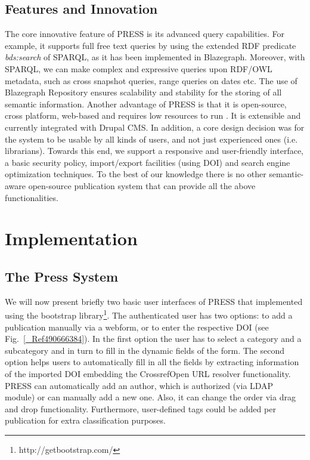 \documentclass[runningheads,a4paper]{llncs}
\begin{document}
\subsection{Features and Innovation}

The core innovative feature of PRESS is its advanced query capabilities. For example, it supports full free text queries by using the extended RDF predicate {\em bds:search} of SPARQL, as it has been implemented in Blazegraph. Moreover, with SPARQL, we can make complex and expressive queries upon RDF/OWL metadata, such as cross snapshot queries, range queries on dates etc.  The use of Blazegraph Repository ensures scalability and stability  \cite{_Ref490664453} for the storing of all semantic information. Another advantage of PRESS is that it is open-source, cross platform, web-based and requires low resources to run  \cite{_Ref490664467}. It is extensible and currently integrated with Drupal CMS. In addition, a core design decision was for the system to be usable by all kinds of users, and not just experienced ones (i.e. librarians). Towards this end, we support a responsive and user-friendly interface, a basic security policy, import/export facilities (using DOI) and search engine optimization techniques. To the best of our knowledge there is no other semantic-aware open-source publication system that can provide all the above functionalities.

\section{Implementation}

\subsection{The Press System}

We will now present briefly two basic user interfaces of PRESS that implemented using the bootstrap library\footnote{ http://getbootstrap.com/}. The authenticated user has two options: to add a publication manually via a webform, or to enter the respective DOI  \cite{_Ref490665523} (see Fig.~\ref{_Ref490666384}). In the first option the user has to select a category and a subcategory and in turn to fill in the dynamic fields of the form. The second option helps users to automatically fill in all the fields by extracting information of the imported DOI embedding the CrossrefOpen URL resolver functionality. PRESS can automatically add an author, which is authorized (via LDAP module) or can manually add a new one. Also, it can change the order via drag and drop functionality. Furthermore, user-defined tags could be added per publication for extra classification purposes.
\end{document}

